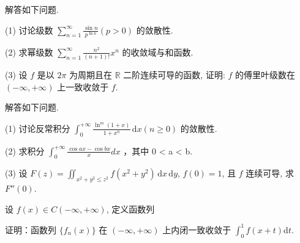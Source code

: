 解答如下问题.\par
(1) 讨论级数 $\sum_{n=1}^{\infty} \frac{\sin n}{p^{\ln n}} (p > 0)$ 的敛散性.\par
(2) 求幂级数  $\sum_{n=1}^{\infty}\frac{n^{2}}{(n+1)!}x^{n}$  的收敛域与和函数.\par
(3) 设 $f$ 是以 $2\pi$ 为周期且在 $\mathbb{R}$ 二阶连续可导的函数, 证明: $f$ 的傅里叶级数在 $(- \infty, + \infty)$ 上一致收敛于 $f$.\par
\par{}
解答如下问题.\par
(1) 讨论反常积分 $\int_0^{+\infty} \frac{\ln^m (1 + x)}{1 + x^n} \, \mathrm{d}x (n \geq 0)$ 的敛散性.\par
(2) 求积分  $\int_{0}^{+\infty}\frac{\cos ax - \cos bx}{x}dx$ ，其中 0 < a < b.\par
(3) 设 $F(z) = \iint_{x^2 + y^2 \leq z^2} f(x^2 + y^2) \, \mathrm{d}x \, \mathrm{d}y$, $f(0) = 1$, 且 $f$ 连续可导, 求 $F''(0)$.\par
\par{}
\par{}
设 $f(x) \in C(-\infty, +\infty)$, 定义函数列\par
\nopagebreak[4]
证明：函数列 $\{f_n(x)\}$ 在 $(- \infty, +\infty)$ 上内闭一致收敛于 $\int_0^1 f(x + t) \mathrm{d}t$.\par
